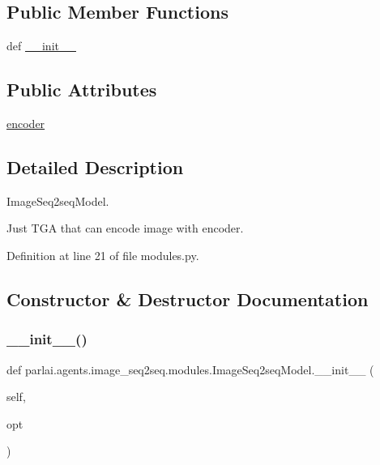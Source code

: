 \subsection*{Public Member Functions}
\begin{DoxyCompactItemize}
\item 
def \hyperlink{classparlai_1_1agents_1_1image__seq2seq_1_1modules_1_1ImageSeq2seqModel_abc4e9cf17bc39eebeb506ddf5fcea2b3}{\+\_\+\+\_\+init\+\_\+\+\_\+}
\end{DoxyCompactItemize}
\subsection*{Public Attributes}
\begin{DoxyCompactItemize}
\item 
\hyperlink{classparlai_1_1agents_1_1image__seq2seq_1_1modules_1_1ImageSeq2seqModel_a1778f43e2d6791c04c2c786e71b1adae}{encoder}
\end{DoxyCompactItemize}


\subsection{Detailed Description}
\begin{DoxyVerb}ImageSeq2seqModel.

Just TGA that can encode image with encoder.
\end{DoxyVerb}
 

Definition at line 21 of file modules.\+py.



\subsection{Constructor \& Destructor Documentation}
\mbox{\label{classparlai_1_1agents_1_1image__seq2seq_1_1modules_1_1ImageSeq2seqModel_abc4e9cf17bc39eebeb506ddf5fcea2b3}} 
\subsubsection{\texorpdfstring{\+\_\+\+\_\+init\+\_\+\+\_\+()}{\_\_init\_\_()}}
{\footnotesize\ttfamily def parlai.\+agents.\+image\+\_\+seq2seq.\+modules.\+Image\+Seq2seq\+Model.\+\_\+\+\_\+init\+\_\+\+\_\+ (\begin{DoxyParamCaption}\item[{}]{self,  }\item[{}]{opt }\end{DoxyParamCaption})}



